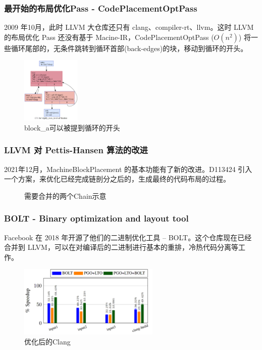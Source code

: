 \begin{frame}
    \frametitle{最开始的布局优化Pass - CodePlacementOptPass}

    2009 年10月，此时 LLVM 大仓库还只有 clang、compiler-rt、llvm。这时 LLVM 的布局优化 Pass 还没有基于 Macine-IR，CodePlacementOptPass ($O(n^2)$) \cite{llvmcodeplacementopt2009}将一些循环尾部的，无条件跳转到循环首部(back-edges)的块，移动到循环的开头。

    \begin{figure}
        \centering
        \includegraphics[width=0.25\textwidth]{images/slightly_more_involved.png}
        \caption{block\_a可以被提到循环的开头}
    \end{figure}

\end{frame}


\begin{frame}
    \frametitle{LLVM 对 Pettis-Hansen 算法的改进}

    2021年12月，MachineBlockPlacement 的基本功能有了新的改进。D113424\cite{llvmexttspbbl2021} 引入一个方案，来优化已经完成链剖分之后的，生成最终的代码布局的过程。

    \begin{figure}
        
        \caption{需要合并的两个Chain示意}
    \end{figure}

\end{frame}

\begin{frame}
    \frametitle{BOLT - Binary optimization and layout tool}

    Facebook 在 2018 年开源了他们的二进制优化工具 -- BOLT\cite{facebook2018bolt}\cite{panchenko2019bolt}。这个仓库现在已经合并到 LLVM，可以在对编译后的二进制进行基本的重排，冷热代码分离等工作。

    \begin{figure}
        \centering
        \includegraphics[width=0.6\textwidth]{images/perf_improv_clang.png}
        \caption{优化后的Clang}
    \end{figure}

\end{frame}